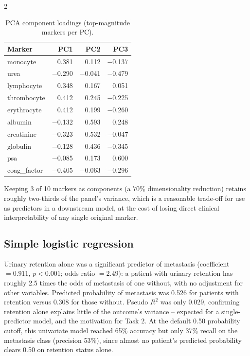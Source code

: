 ﻿\documentclass[a4paper,10pt]{article}
\begin{document}
\begin{multicols*}{2}
\begin{table}[H]
\centering
\caption{PCA component loadings (top-magnitude markers per PC).}
\label{tab:loadings}
\begin{tabular}{lrrr}
\toprule
Marker & PC1 & PC2 & PC3 \\
\midrule
monocyte     & 0.381  & 0.112  & $-$0.137 \\
urea         & $-$0.290 & $-$0.041 & $-$0.479 \\
lymphocyte   & 0.348  & 0.167  & 0.051 \\
thrombocyte  & 0.412  & 0.245  & $-$0.225 \\
erythrocyte  & 0.412  & 0.199  & $-$0.260 \\
albumin      & $-$0.132 & 0.593  & 0.248 \\
creatinine   & $-$0.323 & 0.532  & $-$0.047 \\
globulin     & $-$0.128 & 0.436  & $-$0.345 \\
psa          & $-$0.085 & 0.173  & 0.600 \\
coag\_factor  & $-$0.405 & $-$0.063 & $-$0.296 \\
\bottomrule
\end{tabular}
\end{table}

Keeping 3 of 10 markers as components (a $70\%$ dimensionality reduction) retains roughly two-thirds of the panel's variance, which is a reasonable trade-off for use as predictors in a downstream model, at the cost of losing direct clinical interpretability of any single original marker.

\subsection{Simple logistic regression}
Urinary retention alone was a significant predictor of metastasis (coefficient $=0.911$, $p<0.001$; odds ratio $=2.49$): a patient with urinary retention has roughly 2.5 times the odds of metastasis of one without, with no adjustment for other variables. Predicted probability of metastasis was 0.526 for patients with retention versus 0.308 for those without. Pseudo $R^2$ was only 0.029, confirming retention alone explains little of the outcome's variance -- expected for a single-predictor model, and the motivation for Task 2. At the default 0.50 probability cutoff, this univariate model reached 65\% accuracy but only 37\% recall on the metastasis class (precision 53\%), since almost no patient's predicted probability clears 0.50 on retention status alone.


\end{multicols*}
\end{document}
